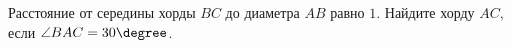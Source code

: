 \begin{ex}
	\begin{condition}
		Расстояние от середины хорды \( BC  \) до диаметра \( AB \)	равно \( 1 \). Найдите хорду \( AC \), если \( \angle BAC = 30\degree\).
	\end{condition}
\end{ex}